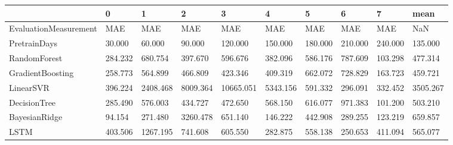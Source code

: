 \begin{tabular}{llllllllll}
\toprule
{} &       0 &        1 &        2 &         3 &        4 &       5 &       6 &       7 &     mean \\
\midrule
EvaluationMeasurement &     MAE &      MAE &      MAE &       MAE &      MAE &     MAE &     MAE &     MAE &      NaN \\
PretrainDays          &  30.000 &   60.000 &   90.000 &   120.000 &  150.000 & 180.000 & 210.000 & 240.000 &  135.000 \\
RandomForest          & 284.232 &  680.754 &  397.670 &   596.676 &  382.096 & 586.176 & 787.609 & 103.298 &  477.314 \\
GradientBoosting      & 258.773 &  564.899 &  466.809 &   423.346 &  409.319 & 662.072 & 728.829 & 163.723 &  459.721 \\
LinearSVR             & 396.224 & 2408.468 & 8009.364 & 10665.051 & 5343.156 & 591.332 & 296.091 & 332.452 & 3505.267 \\
DecisionTree          & 285.490 &  576.003 &  434.727 &   472.650 &  568.150 & 616.077 & 971.383 & 101.200 &  503.210 \\
BayesianRidge         &  94.154 &  271.480 & 3260.478 &   651.140 &  146.222 & 442.908 & 289.255 & 123.219 &  659.857 \\
LSTM                  & 403.506 & 1267.195 &  741.608 &   605.550 &  282.875 & 558.138 & 250.653 & 411.094 &  565.077 \\
\bottomrule
\end{tabular}
